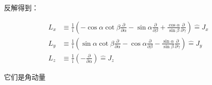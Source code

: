 反解得到：

\begin{align}
L_{x} & \equiv\frac{1}{\mathrm{i}}\left(-\cos\alpha\cot\beta\frac{\partial}{\partial\alpha}-\sin\alpha\frac{\partial}{\partial\beta}+\frac{\cos\alpha}{\sin\beta}\frac{\partial}{\partial\gamma}\right)\hat{=}J_{x}\nonumber \\
L_{y} & \equiv\frac{1}{\mathrm{i}}\left(\sin\alpha\cot\beta\frac{\partial}{\partial\alpha}-\cos\alpha\frac{\partial}{\partial\beta}-\frac{\sin\alpha}{\sin\beta}\frac{\partial}{\partial\gamma}\right)\hat{=}J_{y}\\
L_{z} & \equiv\frac{1}{\mathrm{i}}\left(-\frac{\partial}{\partial\alpha}\right)\hat{=}J_{z}\nonumber 
\end{align}
 

它们是角动量
